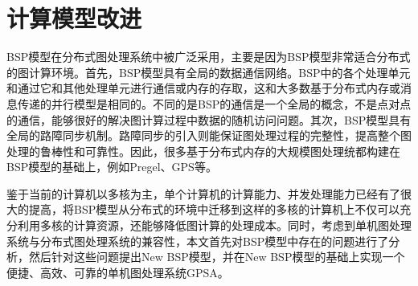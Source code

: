 \section{计算模型改进}

BSP模型在分布式图处理系统中被广泛采用，主要是因为BSP模型非常适合分布式的图计算环境。首先，BSP模型具有全局的数据通信网络。BSP中的各个处理单元和通过它和其他处理单元进行通信或内存的存取，这和大多数基于分布式内存或消息传递的并行模型是相同的。不同的是BSP的通信是一个全局的概念，不是点对点的通信，能够很好的解决图计算过程中数据的随机访问问题。其次，BSP模型具有全局的路障同步机制。路障同步的引入则能保证图处理过程的完整性，提高整个图处理的鲁棒性和可靠性。因此，很多基于分布式内存的大规模图处理统都构建在BSP模型的基础上，例如Pregel、GPS等。

鉴于当前的计算机以多核为主，单个计算机的计算能力、并发处理能力已经有了很大的提高，将BSP模型从分布式的环境中迁移到这样的多核的计算机上不仅可以充分利用多核的计算资源，还能够降低图计算的处理成本。同时，考虑到单机图处理系统与分布式图处理系统的兼容性，本文首先对BSP模型中存在的问题进行了分析，然后针对这些问题提出New BSP模型，并在New BSP模型的基础上实现一个便捷、高效、可靠的单机图处理系统GPSA。

